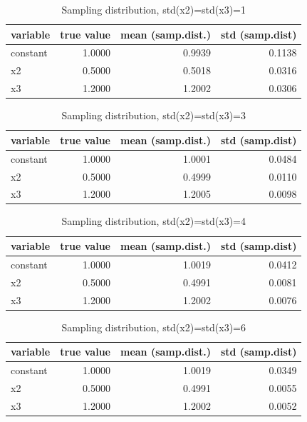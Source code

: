 \documentclass[11pt,reqno]{article}   %
\begin{document}
\begin{table}[!h]
\centering
\caption{Sampling distribution, std(x2)=std(x3)=1} 
\begin{tabular}{lrrr}
  \hline
variable & true value & mean (samp.dist.) & std (samp.dist) \\ 
  \hline
constant & 1.0000 & 0.9939 & 0.1138 \\ 
  x2 & 0.5000 & 0.5018 & 0.0316 \\ 
  x3 & 1.2000 & 1.2002 & 0.0306 \\ 
   \hline
\end{tabular}
\end{table}%
\begin{table}[!h]
\centering
\caption{Sampling distribution, std(x2)=std(x3)=3} 
\begin{tabular}{lrrr}
  \hline
variable & true value & mean (samp.dist.) & std (samp.dist) \\ 
  \hline
constant & 1.0000 & 1.0001 & 0.0484 \\ 
  x2 & 0.5000 & 0.4999 & 0.0110 \\ 
  x3 & 1.2000 & 1.2005 & 0.0098 \\ 
   \hline
\end{tabular}
\end{table}%
\begin{table}[!h]
\centering
\caption{Sampling distribution, std(x2)=std(x3)=4} 
\begin{tabular}{lrrr}
  \hline
variable & true value & mean (samp.dist.) & std (samp.dist) \\ 
  \hline
constant & 1.0000 & 1.0019 & 0.0412 \\ 
  x2 & 0.5000 & 0.4991 & 0.0081 \\ 
  x3 & 1.2000 & 1.2002 & 0.0076 \\ 
   \hline
\end{tabular}
\end{table}%
\begin{table}[!h]
\centering
\caption{Sampling distribution, std(x2)=std(x3)=6} 
\begin{tabular}{lrrr}
  \hline
variable & true value & mean (samp.dist.) & std (samp.dist) \\ 
  \hline
constant & 1.0000 & 1.0019 & 0.0349 \\ 
  x2 & 0.5000 & 0.4991 & 0.0055 \\ 
  x3 & 1.2000 & 1.2002 & 0.0052 \\ 
   \hline
\end{tabular}
\end{table}
\end{document}
